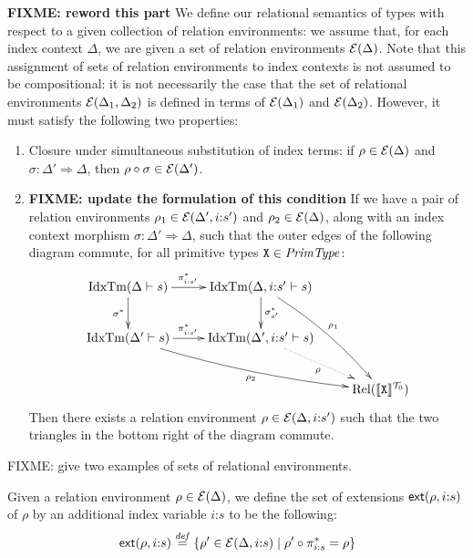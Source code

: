 \textbf{FIXME: reword this part} We define our relational semantics of
types with respect to a given collection of relation environments: we
assume that, for each index context $\Delta$, we are given a set of
relation environments $\mathcal{E}(\Delta)$. Note that this assignment
of sets of relation environments to index contexts is not assumed to
be compositional: it is not necessarily the case that the set of
relational environments $\mathcal{E}(\Delta_1,\Delta_2)$ is defined in
terms of $\mathcal{E}(\Delta_1)$ and $\mathcal{E}(\Delta_2)$. However,
it must satisfy the following two properties:
\begin{enumerate}
\item Closure under simultaneous substitution of index terms: if $\rho
  \in \mathcal{E}(\Delta)$ and $\sigma : \Delta' \Rightarrow \Delta$,
  then $\rho \circ \sigma \in \mathcal{E}(\Delta')$.
\item \textbf{FIXME: update the formulation of this condition} If we
  have a pair of relation environments $\rho_1 \in \mathcal{E}(\Delta',
  i\mathord:s')$ and $\rho_2 \in \mathcal{E}(\Delta)$, along with an
  index context morphism $\sigma : \Delta' \Rightarrow \Delta$, such
  that the outer edges of the following diagram commute, for all
  primitive types $\texttt{X} \in \mathit{PrimType}$:
  \begin{displaymath}
    \xymatrix{
      {\idxTms{\Delta}{s}} \ar[r]^(.45){\pi^*_{i\mathord:s'}} \ar[d]_{\sigma^*}
      &
      {\idxTms{\Delta,i\mathord:s'}{s}} \ar[d]^{\sigma_{s'}^*} \ar@/^/[rdd]^{\rho_1}
      \\
      {\idxTms{\Delta'}{s}} \ar[r]^(.45){\pi^*_{i\mathord:s'}} \ar@/_/[rrd]_{\rho_2}
      &
      {\idxTms{\Delta',i\mathord:s'}{s}} \ar@{.>}[dr]_\rho
      \\
      &
      &
      {\Rel(\tyPrimSem{\tyPrimNm{X}})}
    }
  \end{displaymath}
  Then there exists a relation environment $\rho \in
  \mathcal{E}(\Delta,i\mathord:s')$ such that the two triangles in the
  bottom right of the diagram commute.
\end{enumerate}

\begin{example}
  FIXME: give two examples of sets of relational environments.
\end{example}

Given a relation environment $\rho \in \mathcal{E}(\Delta)$, we define
the set of extensions $\mathsf{ext}(\rho,i\mathord:s)$ of $\rho$ by an
additional index variable $i\mathord:s$ to be the following:
\begin{displaymath}
  \mathsf{ext}(\rho,i\mathord:s) \stackrel{\mathit{def}}= \{ \rho' \in \mathcal{E}(\Delta,i\mathord:s) \mathrel| \rho' \circ \pi^*_{i\mathord:s} = \rho \}
\end{displaymath}

